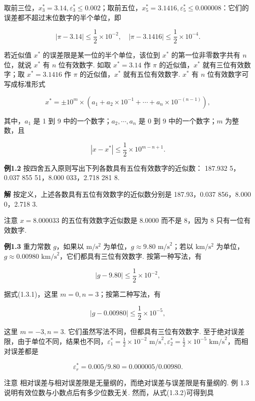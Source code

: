 \documentclass[
  10pt,
  a4paper,
]{article}
\begin{document}
取前三位，\(x_3^* = 3.14, \varepsilon_3^* \leqslant 0.002\)；取前五位，\(x_5^* = 3.1416, \varepsilon_5^* \leqslant 0.000008\)：它们的误差都不超过末位数字的半个单位，即

\[
|\pi - 3.14| \leqslant \frac{1}{2} \times 10^{-2}, \quad |\pi - 3.1416| \leqslant \frac{1}{2} \times 10^{-4}.
\]

若近似值 \(x^*\) 的误差限是某一位的半个单位，该位到 \(x^*\)
的第一位非零数字共有 \(n\) 位，就说 \(x^*\) 有 \(n\) 位有效数字. 如取
\(x^* = 3.14\) 作 \(\pi\) 的近似值，\(x^*\) 就有三位有效数字；取
\(x^* = 3.1416\) 作 \(\pi\) 的近似值，\(x^*\) 就有五位有效数字. \(x^*\)
有 \(n\) 位有效数字可写成标准形式

\[
x^* = \pm 10^m \times (a_1 + a_2 \times 10^{-1} + \cdots + a_n \times 10^{-(n-1)}), \tag{1.3.1}
\]

其中，\(a_1\) 是 1 到 9 中的一个数字；\(a_2, \cdots, a_n\) 是 0 到 9
中的一个数字；\(m\) 为整数，且

\[
|x - x^*| \leqslant \frac{1}{2} \times 10^{m-n+1}. \tag{1.3.2}
\]

\textbf{例1.2} 按四舍五入原则写出下列各数具有五位有效数字的近似数：
187.932 5，0.037 855 51，8.000 033，2.718 281 8.

\textbf{解} 按定义，上述各数具有五位有效数字的近似数分别是 187.93，0.037
856，8.000 0，2.718 3.

注意 \(x = 8.000033\) 的五位有效数字近似数是 8.0000 而不是 8，因为 8
只有一位有效数字.

\textbf{例1.3} 重力常数 \(g\)，如果以 \(\mathrm{m/s^2}\)
为单位，\(g \approx 9.80 \text{ m/s}^2\)；若以 \(\mathrm{km/s^2}\)
为单位，\(g \approx 0.00980 \text{ km/s}^2\)，它们都具有三位有效数字.
按第一种写法，有

\[
|g - 9.80| \leqslant \frac{1}{2} \times 10^{-2},
\]

据式(1.3.1)，这里 \(m=0, n=3\)；按第二种写法，有

\[
|g - 0.00980| \leqslant \frac{1}{2} \times 10^{-5},
\]

这里 \(m=-3, n=3\). 它们虽然写法不同，但都具有三位有效数字.
至于绝对误差限，由于单位不同，结果也不同，\(\varepsilon_1^* = \frac{1}{2} \times 10^{-2} \text{ m/s}^2, \varepsilon_2^* = \frac{1}{2} \times 10^{-5} \text{ km/s}^2\)，而相对误差都是

\[
\varepsilon_r^* = 0.005/9.80 = 0.000005/0.00980.
\]

注意 相对误差与相对误差限是无量纲的，而绝对误差与误差限是有量纲的. 例
1.3 说明有效位数与小数点后有多少位数无关. 然而，从式(1.3.2)可得到具
\end{document}
